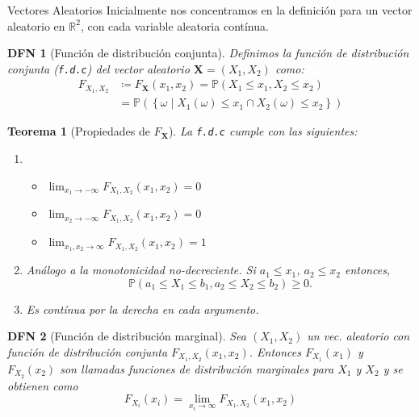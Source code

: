 \documentclass[a4paper]{article}
\title{}
\author{}
\newtheorem{definition}{DFN}
\theoremstyle{mytheoremstyle}
\newtheorem{theorem}{Teorema}
\newcommand{\IP}{\mathbb{P}}
\newcommand{\R}{\mathbb{R}}
\newcommand{\1}{\mathds{1}}
\providecommand{\set}[1]{\left\{#1\right\}}
\renewcommand{\vec}[1]{\boldsymbol{#1}}
\begin{document}
\begin{multicols*}{3}

\begin{roundbox}{Vectores Aleatorios}
Inicialmente nos concentramos en la definición para un vector aleatorio en $\R^2$, con cada variable aleatoria contínua.

\begin{definition}[Función de distribución conjunta]
Definimos la función de distribución conjunta (\texttt{f.d.c}) del vector aleatorio $\vec{X}=(X_1, X_2)$ como: 
    \begin{align*}
        F_{X_1, X_2} &\coloneqq F_{\vec{X}} (x_1, x_2) = \IP(X_1 \leq x_1, X_2 \leq x_2) \\
        &= \IP(\set{\omega \mid X_1(\omega) \leq x_1 \cap X_2(\omega) \leq x_2})
    \end{align*}
\end{definition}

\begin{theorem}[Propiedades de $F_{\vec{X}}$]
La \texttt{f.d.c} cumple con las siguientes:
    \begin{enumerate}
        \item
        \begin{itemize}
            \item $\lim_{x_1 \to -\infty} F_{X_1, X_2} (x_1, x_2) = 0$
            \item $\lim_{x_2 \to -\infty} F_{X_1, X_2} (x_1, x_2) = 0$
            \item $\lim_{x_1, x_2 \to \infty} F_{X_1, X_2} (x_1, x_2) = 1$
        \end{itemize}
        \item Análogo a la monotonicidad no-decreciente. Si $a_1 \leq x_1$, $a_2 \leq x_2$ entonces,
        \begin{equation*}
            \IP(a_1 \leq X_1 \leq b_1, a_2 \leq X_2 \leq b_2 ) \geq 0.
        \end{equation*}
        \item Es contínua por la derecha en cada argumento.
    \end{enumerate}
\end{theorem}

\begin{definition}[Función de distribución marginal]
    Sea $(X_1, X_2)$ un vec. aleatorio con función de distribución conjunta $F_{X_1, X_2}(x_1, x_2)$.
    Entonces $F_{X_1}(x_1)$ y $F_{X_2}(x_2)$ son llamadas funciones de distribución marginales para $X_1$ y $X_2$ y se obtienen como
    \begin{equation*}
        F_{X_i} (x_i) = \lim_{x_i \to \infty} F_{X_1, X_2}(x_1, x_2)
    \end{equation*}
\end{definition}


\end{roundbox}
\end{multicols*}
\end{document}
